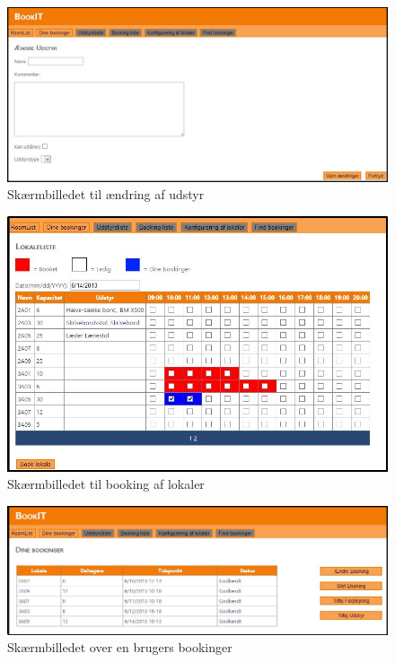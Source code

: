 \begin{figure}[h!]
  \centering
    \includegraphics[angle=90, height=0.9\textheight]{Appendix/GUI-Prototype/DigitalMockup/AendreUdstyr}
  \caption{Skærmbilledet til ændring af udstyr}
\label{App_GUI_final_AendreUdstyr}
\end{figure}

\begin{figure}[h!]
  \centering
    \includegraphics[width=\textwidth]{Appendix/GUI-Prototype/DigitalMockup/GridEksempel}
  \caption{Skærmbilledet til booking af lokaler}
\label{App_GUI_final_GridEksempel}
\end{figure}

\begin{figure}[h!]
  \centering
    \includegraphics[width=\textwidth]{Appendix/GUI-Prototype/DigitalMockup/DineBookinger}
  \caption{Skærmbilledet over en brugers bookinger}
\label{App_GUI_final_DineBookinger}
\end{figure}

